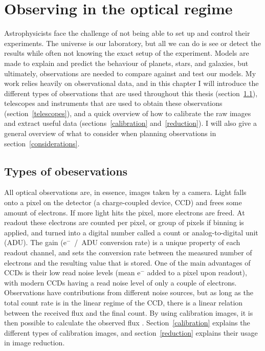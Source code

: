 \documentclass[a4paper,oneside,12pt, class=Latex/Classes/PhDthesisPSnPDF, crop=false]{standalone}
\begin{document}
\doublespacing
\chapter{Observing in the optical regime}
\label{chap:obs}

Astrophysicists face the challenge of not being able to set up and control their experiments. The universe is our laboratory, but all we can do is see or detect the results while often not knowing the exact setup of the experiment. Models are made to explain and predict the behaviour of planets, stars, and galaxies, but ultimately, observations are needed to compare against and test our models. My work relies heavily on observational data, and in this chapter I will introduce the different types of observations that are used throughout this thesis (section~\ref{observation_types}), telescopes and instruments that are used to obtain these observations (section~\ref{telescopes}), and a quick overview of how to calibrate the raw images and extract useful data (sections~\ref{calibration} and~\ref{reduction}). I will also give a general overview of what to consider when planning observations in section~\ref{considerations}.


\section{Types of obeservations}
\label{observation_types}
All optical observations are, in essence, images taken by a camera. Light falls onto a pixel on the detector (a charge-coupled device, CCD) and frees some amount of electrons. If more light hits the pixel, more electrons are freed. At readout these electrons are counted per pixel, or group of pixels if binning is applied, and turned into a digital number called a count or analog-to-digital unit (ADU). The gain (e$^-$~/~ADU conversion rate) is a unique property of each readout channel, and sets the conversion rate between the measured number of electrons and the resulting value that is stored. One of the main advantages of CCDs is their low read noise levels (mean e$^-$ added to a pixel upon readout), with modern CCDs having a read noise level of only a couple of electrons. Observations have contributions from different noise sources, but as long as the total count rate is in the linear regime of the CCD, there is a linear relation between the received flux and the final count. By using calibration images, it is then possible to calculate the observed flux \citep{CCD_handbook}. Section~\ref{calibration} explains the different types of calibration images, and section~\ref{reduction} explains their usage in image reduction.
\end{document}
